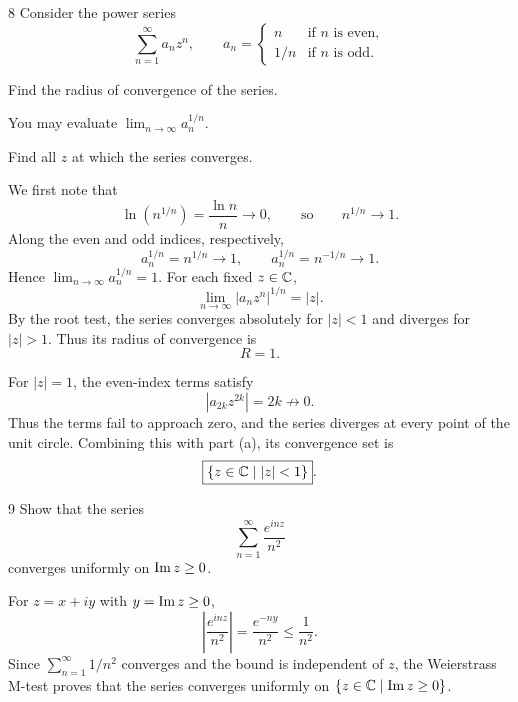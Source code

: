 \documentclass[11pt,oneside]{article}
\begin{document}
\begin{problem}{8}
Consider the power series
\[
    \sum_{n=1}^{\infty}a_nz^n,
    \qquad
    a_n=\begin{cases}
        n & \text{if $n$ is even}, \\
        1/n & \text{if $n$ is odd}.
    \end{cases}
\]
\begin{problemsubparts}
    \item Find the radius of convergence of the series.
    \begin{hint}
    You may evaluate $\displaystyle\lim_{n\to\infty}a_n^{1/n}$.
    \end{hint}
    \item Find all $z$ at which the series converges.
\end{problemsubparts}
\end{problem}

\begin{solution}
\begin{problemsubparts}
    \item We first note that
    \[
        \ln(n^{1/n})=\frac{\ln n}{n}\longrightarrow0,
        \qquad\text{so}\qquad n^{1/n}\longrightarrow1.
    \]
    Along the even and odd indices, respectively,
    \[
        a_n^{1/n}=n^{1/n}\longrightarrow1,
        \qquad
        a_n^{1/n}=n^{-1/n}\longrightarrow1.
    \]
    Hence $\lim_{n\to\infty}a_n^{1/n}=1$. For each fixed $z\in\mathbb{C}$,
    \[
        \lim_{n\to\infty}|a_nz^n|^{1/n}=|z|.
    \]
    By the root test, the series converges absolutely for $|z|<1$ and diverges for $|z|>1$. Thus its radius of convergence is
    \[
        \boxed{R=1}.
    \]

    \item For $|z|=1$, the even-index terms satisfy
    \[
        |a_{2k}z^{2k}|=2k\not\longrightarrow0.
    \]
    Thus the terms fail to approach zero, and the series diverges at every point of the unit circle. Combining this with part (a), its convergence set is
    \[
        \boxed{\{z\in\mathbb{C}\mid |z|<1\}}.
    \]
\end{problemsubparts}
\end{solution}

\begin{problem}{9}
Show that the series
\[
    \sum_{n=1}^{\infty}\frac{e^{inz}}{n^2}
\]
converges uniformly on $\operatorname{Im} z\ge0$.
\end{problem}

\begin{solution}[1]
For $z=x+iy$ with $y=\operatorname{Im} z\ge0$,
\[
    \left|\frac{e^{inz}}{n^2}\right|
    =\frac{e^{-ny}}{n^2}\le\frac1{n^2}.
\]
Since $\sum_{n=1}^{\infty}1/n^2$ converges and the bound is independent of $z$, the Weierstrass M-test proves that the series converges uniformly on $\{z\in\mathbb{C}\mid\operatorname{Im} z\ge0\}$.
\end{solution}
\end{document}
